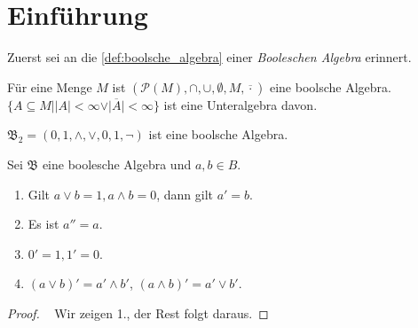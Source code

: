 \section{Einführung}

Zuerst sei an die \cref{def:boolsche_algebra} einer \emph{Booleschen Algebra} erinnert.

\begin{example}
    Für eine Menge $M$ ist $(\mathcal{P}(M), \cap, \cup, \emptyset, M, \overline{\cdot})$ eine boolsche Algebra. $\{A \subseteq M \mid \vert A\vert < \infty \lor \vert \overline{A} \vert < \infty\}$ ist eine Unteralgebra davon.
\end{example}
\begin{example}
    $\mathfrak{B}_2 = ({0,1}, \land, \lor, 0, 1, \lnot)$ ist eine boolsche Algebra.
\end{example}

\begin{lemma}
    Sei $\mathfrak{B}$ eine boolesche Algebra und $a,b \in B$.
    \begin{enumerate}
        \item Gilt $a \lor b = 1, a \land b = 0$, dann gilt $a' = b$.
        \item Es ist $a'' = a$.
        \item $0' = 1, 1' = 0$.
        \item $(a \lor b)' = a' \land b'$, $(a \land b)' = a' \lor b'$.
    \end{enumerate}
\end{lemma}
\begin{proof}{\ }
    Wir zeigen 1., der Rest folgt daraus.
\end{proof}